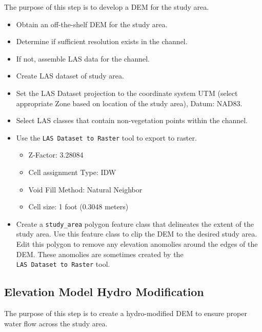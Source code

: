 \documentclass[]{book}
\providecommand{\tightlist}{%
  \setlength{\itemsep}{0pt}\setlength{\parskip}{0pt}}
\theoremstyle{definition}
\theoremstyle{definition}
\theoremstyle{definition}
\theoremstyle{remark}
\begin{document}
The purpose of this step is to develop a DEM for the study area.

\begin{itemize}
\tightlist
\item
  Obtain an off-the-shelf DEM for the study area.
\item
  Determine if sufficient resolution exists in the channel.
\item
  If not, assemble LAS data for the channel.
\item
  Create LAS dataset of study area.
\item
  Set the LAS Dataset projection to the coordinate system UTM (select
  appropriate Zone based on location of the study area), Datum: NAD83.
\item
  Select LAS classes that contain non-vegetation points within the
  channel.
\item
  Use the \texttt{LAS\ Dataset\ to\ Raster} tool to export to raster.

  \begin{itemize}
  \tightlist
  \item
    Z-Factor: 3.28084
  \item
    Cell assignment Type: IDW
  \item
    Void Fill Method: Natural Neighbor
  \item
    Cell size: 1 foot (0.3048 meters)
  \end{itemize}
\item
  Create a \texttt{study\_area} polygon feature class that delineates
  the extent of the study area. Use this feature class to clip the DEM
  to the desired study area. Edit this polygon to remove any elevation
  anomolies around the edges of the DEM. These anomolies are sometimes
  created by the \texttt{LAS\ Dataset\ to\ Raster} tool.
\end{itemize}

\subsection{Elevation Model Hydro
Modification}\label{elevation-model-hydro-modification}

The purpose of this step is to create a hydro-modified DEM to ensure
proper water flow across the study area.
\end{document}
